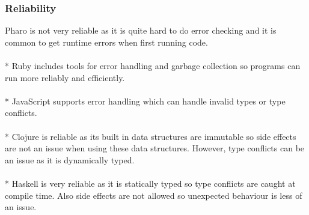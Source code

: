 \subsubsection*{Reliability}
Pharo is not very reliable as it is quite hard to do error checking and it is common to get runtime errors when first running code.\\\\*
Ruby includes tools for error handling and garbage collection so programs can run more reliably and efficiently.\\\\*
JavaScript supports error handling which can handle invalid types or type conflicts.\\\\*
Clojure is reliable as its built in data structures are immutable so side effects are not an issue when using these data structures. However, type conflicts can be an issue as it is dynamically typed.\\\\*
Haskell is very reliable as it is statically typed so type conflicts are caught at compile time. Also side effects are not allowed so unexpected behaviour is less of an issue.
